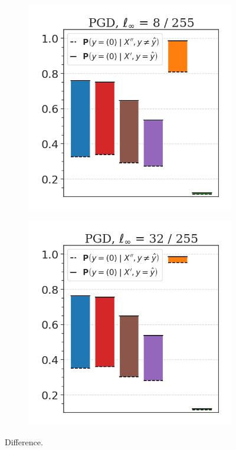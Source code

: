 \begin{figure}[H]
    \centering
    \begin{subfigure}[b]{0.49\textwidth}
        \centering
        \includegraphics[width=\textwidth]{img/results_discussion/adversarial/DIFF_PGD_0.0314.png}
    \end{subfigure}
    \hfill
    \begin{subfigure}[b]{0.49\textwidth}
        \centering
        \includegraphics[width=\textwidth]{img/results_discussion/adversarial/DIFF_PGD_0.1255.png}
    \end{subfigure}
    \caption{Difference.}
    \label{fig:gaussian_optimization}
\end{figure}


